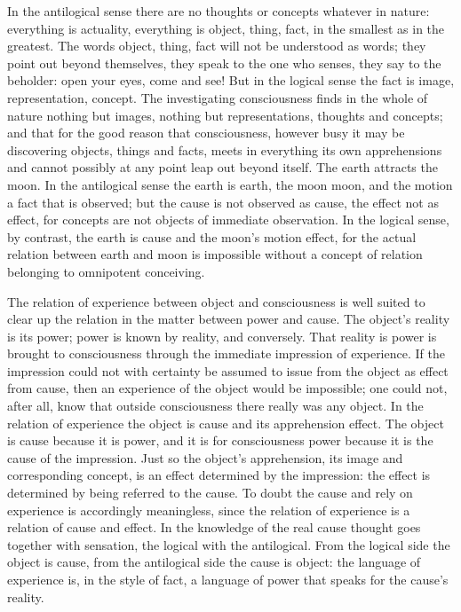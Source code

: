 \documentclass[12pt,a4paper]{book}
\begin{document}
In the antilogical sense there are no thoughts or concepts whatever in nature: everything is
actuality, everything is object, thing, fact, in the smallest as in the greatest. The words
object, thing, fact will not be understood as words; they point out beyond themselves, they
speak to the one who senses, they say to the beholder: open your eyes, come and see! But in the
logical sense the fact is image, representation, concept. The investigating consciousness finds
in the whole of nature nothing but images, nothing but representations, thoughts and concepts;
and that for the good reason that consciousness, however busy it may be discovering objects,
things and facts, meets in everything its own apprehensions and cannot possibly at any point
leap out beyond itself. The earth attracts the moon. In the antilogical sense the earth is
earth, the moon moon, and the motion a fact that is observed; but the cause is not observed as
cause, the effect not as effect, for concepts are not objects of immediate observation. In the
logical sense, by contrast, the earth is cause and the moon's motion effect, for the actual
relation between earth and moon is impossible without a concept of relation belonging to
omnipotent conceiving.

The relation of experience between object and consciousness is well suited to clear up the
relation in the matter between power and cause. The object's reality is its power; power is
known
by reality, and conversely. That reality is power is brought to consciousness through the
immediate impression of experience. If the impression could not with certainty be assumed to
issue from the object as effect from cause, then an experience of the object would be
impossible; one could not, after all, know that outside consciousness there really was any
object. In the relation of experience the object is cause and its apprehension effect. The
object is cause because it is power, and it is for consciousness power because it is the cause
of the impression. Just so the object's apprehension, its image and corresponding concept, is an
effect determined by the impression: the effect is determined by being referred to the cause. To
doubt the cause and rely on experience is accordingly meaningless, since the relation of
experience is a relation of cause and effect. In the knowledge of the real cause thought goes
together with sensation, the logical with the antilogical. From the logical side the object is
cause, from the antilogical side the cause is object: the language of experience is, in the
style of fact, a language of power that speaks for the cause's reality.
\end{document}
